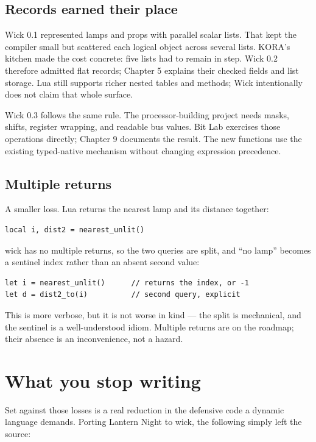 \subsection{Records earned their place}

Wick 0.1 represented lamps and props with parallel scalar lists. That kept
the compiler small but scattered each logical object across several lists.
KORA's kitchen made the cost concrete: five lists had to remain in step.
Wick 0.2 therefore admitted flat records; Chapter 5 explains their checked
fields and list storage. Lua still supports richer nested tables and methods;
Wick intentionally does not claim that whole surface.

Wick 0.3 follows the same rule. The processor-building project needs masks,
shifts, register wrapping, and readable bus values. Bit Lab exercises those
operations directly; Chapter 9 documents the result. The new functions use
the existing typed-native mechanism without changing expression precedence.

\subsection{Multiple returns}

A smaller loss. Lua returns the nearest lamp and its distance together:

\begin{lstlisting}[language=luatwin]
local i, dist2 = nearest_unlit()
\end{lstlisting}

\noindent
wick has no multiple returns, so the two queries are split, and ``no lamp''
becomes a sentinel index rather than an absent second value:

\begin{lstlisting}[language=wick]
let i = nearest_unlit()      // returns the index, or -1
let d = dist2_to(i)          // second query, explicit
\end{lstlisting}

\noindent
This is more verbose, but it is not worse in kind --- the split is mechanical,
and the sentinel is a well-understood idiom. Multiple returns are on the
roadmap; their absence is an inconvenience, not a hazard.

\section{What you stop writing}

Set against those losses is a real reduction in the defensive code a dynamic
language demands. Porting Lantern Night to wick, the following simply left the
source:

